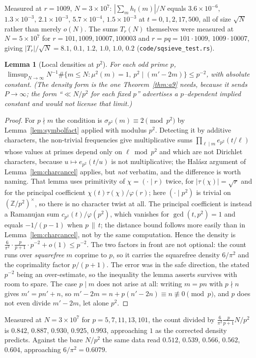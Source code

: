 \documentclass[11pt]{article}
\newtheorem{lemma}[theorem]{Lemma}
\theoremstyle{definition}
\begin{document}
Measured at $r=1009$, $N=3\times10^7$: $|\sum_m h_t(m)|/N$ equals $3.6\times10^{-6}$, $1.3\times10^{-3}$,
$2.1\times10^{-3}$, $5.7\times10^{-4}$, $1.5\times10^{-3}$ at $t=0,1,2,17,500$, all of size $\sqrt N$
rather than merely $o(N)$. The sums $T_r(N)$ themselves were measured at $N=5\times10^7$ for
$r=101,1009,10007,100003$ and $r=pq=101\cdot1009,\,1009\cdot10007$, giving
$|T_r|/\sqrt N=8.1,\,0.1,\,1.2,\,1.0,\,1.0,\,0.2$ \textup{(\texttt{code/sqsieve\_test.rs})}.

\begin{lemma}[Local densities at $p^2$]\label{lem:localsq}
For each odd prime $p$,
$\ \limsup_{N\to\infty}N^{-1}\#\{m\le N:\mu^2(m)=1,\ p^2\mid(m'-2m)\}\le p^{-2}$, with absolute
constant. \textup{(}The density form is the one Theorem~\ref{thm:a9} needs, because it sends
$P\to\infty$; the form ``$\ll N/p^2$ for each fixed $p$'' advertises a $p$--dependent implied
constant and would not license that limit.\textup{)}
\end{lemma}
\begin{proof}
For $p\nmid m$ the condition is $\sigma_{p^2}(m)\equiv2\pmod{p^2}$ by Lemma~\ref{lem:symbolfact}
applied with modulus $p^2$. Detecting it by additive characters, the non-trivial frequencies give
multiplicative sums $\prod_{\ell\mid m}e_{p^2}(t/\ell)$ whose values at primes depend only on
$\ell\bmod p^2$ and which are not Dirichlet characters, because $u\mapsto e_{p^2}(t/u)$ is not
multiplicative; the Hal\'asz argument of Lemma~\ref{lem:charcancel} applies, but \emph{not}
verbatim, and the difference is worth naming. That lemma uses primitivity of $\chi=(\cdot\mid r)$
twice, for $|\tau(\chi)|=\sqrt r$ and for the principal coefficient $\chi(t)\tau(\chi)/\varphi(r)$;
here $(\cdot\mid p^2)$ is trivial on $(\mathbb{Z}/p^2)^\times$, so there is no character twist at
all. The principal coefficient is instead a Ramanujan sum $c_{p^2}(t)/\varphi(p^2)$, which vanishes
for $\gcd(t,p^2)=1$ and equals $-1/(p-1)$ when $p\,\|\,t$; the distance bound follows more easily
than in Lemma~\ref{lem:charcancel}, not by the same computation. Hence the density is
$\tfrac6{\pi^2}\cdot\tfrac p{p+1}\cdot p^{-2}+o(1)\le p^{-2}$. The two factors in front are not optional: the count runs over \emph{squarefree} $m$ coprime to $p$, so it carries the
squarefree density $6/\pi^2$ and the coprimality factor $p/(p+1)$. The error was in the safe
direction, the stated $p^{-2}$ being an over-estimate, so the inequality the lemma asserts survives
with room to spare. The case $p\mid m$ does not arise at all: writing $m=pn$ with $p\nmid n$
gives $m'=pn'+n$, so $m'-2m=n+p(n'-2n)\equiv n\not\equiv0\pmod p$, and $p$ does not even divide
$m'-2m$, let alone $p^2$.
\end{proof}
Measured at $N=3\times10^7$ for $p=5,7,11,13,101$, the count divided by
$\tfrac6{\pi^2}\tfrac p{p+1}N/p^2$ is $0.842$, $0.887$, $0.930$, $0.925$, $0.993$, approaching $1$ as
the corrected density predicts. Against the bare $N/p^2$ the same data read $0.512$, $0.539$,
$0.566$, $0.562$, $0.604$, approaching $6/\pi^2=0.6079$.
\end{document}
